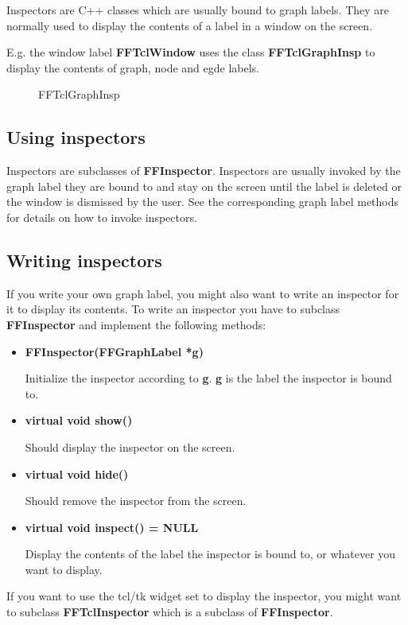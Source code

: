 Inspectors are C++ classes which are usually bound to graph
labels. They are normally used to display the contents of a label in a
window on the screen.

E.g. the window label {\bf FFTclWindow} uses the class {\bf
FFTclGraphInsp} to display the contents of graph, node and egde
labels.

\begin{figure}[htb]
\noindent
{}
\caption{FFTclGraphInsp}
\end{figure}

\subsection{Using inspectors}

Inspectors are subclasses of {\bf FFInspector}. 
Inspectors are usually invoked by the graph label they are bound to
and stay on the screen until the label is deleted or the window is
dismissed by the user. See the corresponding graph label methods for
details on how to invoke inspectors.

\subsection{Writing inspectors}
\label{writing_inspectors}

If you write your own graph label, you might also want to write an
inspector for it to display its contents. To write an inspector you
have to subclass {\bf FFInspector} and implement the following
methods:

\begin{itemize}

\item{\bf FFInspector(FFGraphLabel *g)}

Initialize the inspector according to {\bf g}. {\bf g} is the label
the inspector is bound to.

\item{\bf virtual void show()}

Should display the inspector on the screen.

\item{\bf virtual void hide()}

Should remove the inspector from the screen.

\item{\bf virtual void inspect() = NULL}

Display the contents of the label the inspector is bound to, or
whatever you want to display.

\end{itemize}

If you want to use the tcl/tk widget set to display the inspector, you
might want to subclass {\bf FFTclInspector} which is a subclass of
{\bf FFInspector}.

